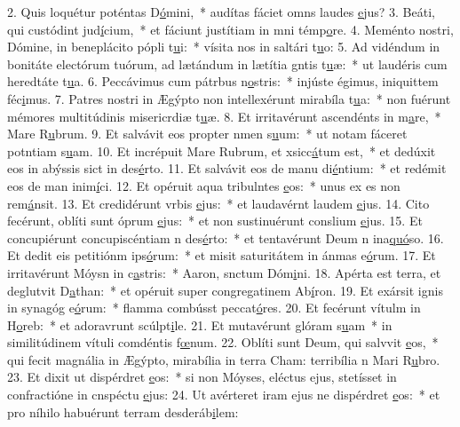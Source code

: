 2. Quis loquétur poténtas D\uline{ó}mini,~* audítas fáciet omns laudes \uline{e}jus?
3. Beáti, qui custódint jud\uline{í}cium,~* et fáciunt justítiam in mni témp\uline{o}re.
4. Meménto nostri, Dómine, in beneplácito pópli t\uline{u}i:~* vísita nos in saltári t\uline{u}o:
5. Ad vidéndum in bonitáte electórum tuórum, ad lætándum in lætítia gntis t\uline{u}æ:~* ut laudéris cum heredtáte t\uline{u}a.
6. Peccávimus cum pátrbus n\uline{o}stris:~* injúste égimus, iniquittem féc\uline{i}mus.
7. Patres nostri in Ægýpto non intellexérunt mirabíla t\uline{u}a:~* non fuérunt mémores multitúdinis misericrdiæ t\uline{u}æ.
8. Et irritavérunt ascendénts in m\uline{a}re,~* Mare R\uline{u}brum.
9. Et salvávit eos propter nmen s\uline{u}um:~* ut notam fáceret potntiam s\uline{u}am.
10. Et incrépuit Mare Rubrum, et xsicc\uline{á}tum est,~* et dedúxit eos in abýssis sict in des\uline{é}rto.
11. Et salvávit eos de manu di\uline{é}ntium:~* et redémit eos de man inim\uline{í}ci.
12. Et opéruit aqua tribulntes \uline{e}os:~* unus ex es non rem\uline{á}nsit.
13. Et credidérunt vrbis \uline{e}jus:~* et laudavérnt laudem \uline{e}jus.
14. Cito fecérunt, oblíti sunt óprum \uline{e}jus:~* et non sustinuérunt conslium \uline{e}jus.
15. Et concupiérunt concupiscéntiam n des\uline{é}rto:~* et tentavérunt Deum n ina\uline{quó}so.
16. Et dedit eis petitiónm ips\uline{ó}rum:~* et misit saturitátem in ánmas e\uline{ó}rum.
17. Et irritavérunt Móysn in c\uline{a}stris:~* Aaron, snctum Dóm\uline{i}ni.
18. Apérta est terra, et deglutvit D\uline{a}than:~* et opéruit super congregatinem Ab\uline{í}ron.
19. Et exársit ignis in synagóg e\uline{ó}rum:~* flamma combússt peccat\uline{ó}res.
20. Et fecérunt vítulm in H\uline{o}reb:~* et adoravrunt scúlpt\uline{i}le.
21. Et mutavérunt glóram s\uline{u}am~* in similitúdinem vítuli comdéntis f\uline{œ}num.
22. Oblíti sunt Deum, qui salvvit \uline{e}os,~* qui fecit magnália in Ægýpto, mirabília in terra Cham: terribília n Mari R\uline{u}bro.
23. Et dixit ut dispérdret \uline{e}os:~* si non Móyses, eléctus ejus, stetísset in confractióne in cnspéctu \uline{e}jus:
24. Ut avérteret iram ejus ne dispérdret \uline{e}os:~* et pro níhilo habuérunt terram desderáb\uline{i}lem:
